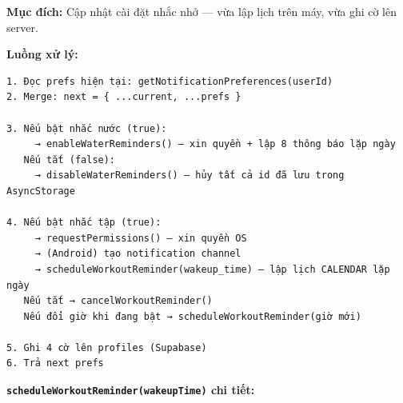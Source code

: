 \documentclass[12pt,a4paper]{article}
\newenvironment{Shaded}{%
  \VerbatimEnvironment
  \begin{quote}\small\ttfamily
}{%
  \end{quote}%
}
\begin{document}
\textbf{Mục đích:} Cập nhật cài đặt nhắc nhở --- vừa lập lịch trên máy,
vừa ghi cờ lên server.

\textbf{Luồng xử lý:}

\begin{verbatim}
1. Đọc prefs hiện tại: getNotificationPreferences(userId)
2. Merge: next = { ...current, ...prefs }

3. Nếu bật nhắc nước (true):
     → enableWaterReminders() — xin quyền + lập 8 thông báo lặp ngày
   Nếu tắt (false):
     → disableWaterReminders() — hủy tất cả id đã lưu trong AsyncStorage

4. Nếu bật nhắc tập (true):
     → requestPermissions() — xin quyền OS
     → (Android) tạo notification channel
     → scheduleWorkoutReminder(wakeup_time) — lập lịch CALENDAR lặp ngày
   Nếu tắt → cancelWorkoutReminder()
   Nếu đổi giờ khi đang bật → scheduleWorkoutReminder(giờ mới)

5. Ghi 4 cờ lên profiles (Supabase)
6. Trả next prefs
\end{verbatim}

\textbf{\texttt{scheduleWorkoutReminder(wakeupTime)} chi tiết:}

\begin{Shaded}
\begin{Highlighting}[]
 \NormalTok{()}\OperatorTok{;}           
\OperatorTok{,}\OperatorTok{=} \OperatorTok{;}  
\OperatorTok{=} \NormalTok{(\{}
\OperatorTok{:}\OperatorTok{:} \OperatorTok{,}\OperatorTok{:} \OperatorTok{,}\OperatorTok{:} \NormalTok{ \}}\OperatorTok{,}
\OperatorTok{:}\OperatorTok{:}\OperatorTok{,}\OperatorTok{,}\OperatorTok{,}\OperatorTok{:} \NormalTok{ \}}\OperatorTok{,}  
\NormalTok{\})}\OperatorTok{;}
\OperatorTok{,}\OperatorTok{;}  
\end{Highlighting}
\end{Shaded}
\end{document}
